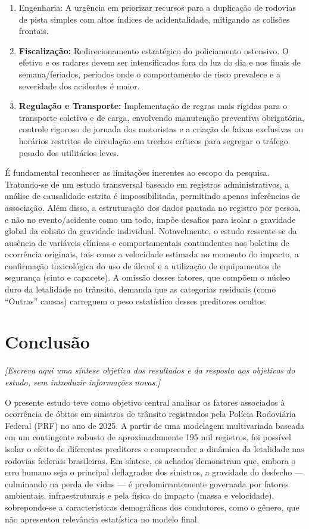 \documentclass[
  brazilian,
  12pt,
]{article}
\begin{document}
\begin{enumerate}
\def\labelenumi{\arabic{enumi}.}
\item
  Engenharia: A urgência em priorizar recursos para a duplicação de
  rodovias de pista simples com altos índices de acidentalidade,
  mitigando as colisões frontais.
\item
  \textbf{Fiscalização:} Redirecionamento estratégico do policiamento
  ostensivo. O efetivo e os radares devem ser intensificados fora da luz
  do dia e nos finais de semana/feriados, períodos onde o comportamento
  de risco prevalece e a severidade dos acidentes é maior.
\item
  \textbf{Regulação e Transporte:} Implementação de regras mais rígidas
  para o transporte coletivo e de carga, envolvendo manutenção
  preventiva obrigatória, controle rigoroso de jornada dos motoristas e
  a criação de faixas exclusivas ou horários restritos de circulação em
  trechos críticos para segregar o tráfego pesado dos utilitários leves.
\end{enumerate}

É fundamental reconhecer as limitações inerentes ao escopo da pesquisa.
Tratando-se de um estudo transversal baseado em registros
administrativos, a análise de causalidade estrita é impossibilitada,
permitindo apenas inferências de associação. Além disso, a estruturação
dos dados pautada no registro por pessoa, e não no evento/acidente como
um todo, impõe desafios para isolar a gravidade global da colisão da
gravidade individual. Notavelmente, o estudo ressente-se da ausência de
variáveis clínicas e comportamentais contundentes nos boletins de
ocorrência originais, tais como a velocidade estimada no momento do
impacto, a confirmação toxicológica do uso de álcool e a utilização de
equipamentos de segurança (cinto e capacete). A omissão desses fatores,
que compõem o núcleo duro da letalidade no trânsito, demanda que as
categorias residuais (como ``Outras'' causas) carreguem o peso
estatístico desses preditores ocultos.

\section{Conclusão}\label{conclusuxe3o}

\emph{{[}Escreva aqui uma síntese objetiva dos resultados e da resposta
aos objetivos do estudo, sem introduzir informações novas.{]}}

O presente estudo teve como objetivo central analisar os fatores
associados à ocorrência de óbitos em sinistros de trânsito registrados
pela Polícia Rodoviária Federal (PRF) no ano de 2025. A partir de uma
modelagem multivariada baseada em um contingente robusto de
aproximadamente 195 mil registros, foi possível isolar o efeito de
diferentes preditores e compreender a dinâmica da letalidade nas
rodovias federais brasileiras. Em síntese, os achados demonstram que,
embora o erro humano seja o principal deflagrador dos sinistros, a
gravidade do desfecho --- culminando na perda de vidas --- é
predominantemente governada por fatores ambientais, infraestruturais e
pela física do impacto (massa e velocidade), sobrepondo-se a
características demográficas dos condutores, como o gênero, que não
apresentou relevância estatística no modelo final.
\end{document}
